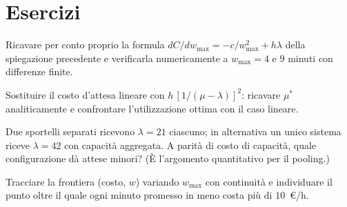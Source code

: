 \section{Esercizi}

\begin{esercizio}[verifica]
Ricavare per conto proprio la formula $dC/dw_{\max} = -c/w_{\max}^2 + h\lambda$ della
spiegazione precedente e verificarla numericamente a $w_{\max} = 4$ e $9$ minuti
con differenze finite.
\end{esercizio}

\begin{esercizio}
Sostituire il costo d'attesa lineare con $h\,[1/(\mu - \lambda)]^2$: ricavare
$\mu^*$ analiticamente e confrontare l'utilizzazione ottima con il caso lineare.
\end{esercizio}

\begin{esercizio}
Due sportelli separati ricevono $\lambda = 21$ ciascuno; in alternativa un unico
sistema riceve $\lambda = 42$ con capacità aggregata. A parità di costo di capacità,
quale configurazione dà attese minori? (È l'argomento quantitativo per il pooling.)
\end{esercizio}

\begin{esercizio}
Tracciare la frontiera (costo, $w$) variando $w_{\max}$ con continuità e
individuare il punto oltre il quale ogni minuto promesso in meno costa più di
$10$~\euro/h.
\end{esercizio}
